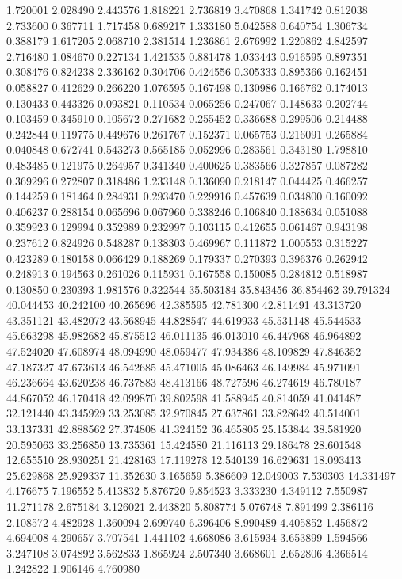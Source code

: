 1.720001
2.028490
2.443576
1.818221
2.736819
3.470868
1.341742
0.812038
2.733600
0.367711
1.717458
0.689217
1.333180
5.042588
0.640754
1.306734
0.388179
1.617205
2.068710
2.381514
1.236861
2.676992
1.220862
4.842597
2.716480
1.084670
0.227134
1.421535
0.881478
1.033443
0.916595
0.897351
0.308476
0.824238
2.336162
0.304706
0.424556
0.305333
0.895366
0.162451
0.058827
0.412629
0.266220
1.076595
0.167498
0.130986
0.166762
0.174013
0.130433
0.443326
0.093821
0.110534
0.065256
0.247067
0.148633
0.202744
0.103459
0.345910
0.105672
0.271682
0.255452
0.336688
0.299506
0.214488
0.242844
0.119775
0.449676
0.261767
0.152371
0.065753
0.216091
0.265884
0.040848
0.672741
0.543273
0.565185
0.052996
0.283561
0.343180
1.798810
0.483485
0.121975
0.264957
0.341340
0.400625
0.383566
0.327857
0.087282
0.369296
0.272807
0.318486
1.233148
0.136090
0.218147
0.044425
0.466257
0.144259
0.181464
0.284931
0.293470
0.229916
0.457639
0.034800
0.160092
0.406237
0.288154
0.065696
0.067960
0.338246
0.106840
0.188634
0.051088
0.359923
0.129994
0.352989
0.232997
0.103115
0.412655
0.061467
0.943198
0.237612
0.824926
0.548287
0.138303
0.469967
0.111872
1.000553
0.315227
0.423289
0.180158
0.066429
0.188269
0.179337
0.270393
0.396376
0.262942
0.248913
0.194563
0.261026
0.115931
0.167558
0.150085
0.284812
0.518987
0.130850
0.230393
1.981576
0.322544
35.503184
35.843456
36.854462
39.791324
40.044453
40.242100
40.265696
42.385595
42.781300
42.811491
43.313720
43.351121
43.482072
43.568945
44.828547
44.619933
45.531148
45.544533
45.663298
45.982682
45.875512
46.011135
46.013010
46.447968
46.964892
47.524020
47.608974
48.094990
48.059477
47.934386
48.109829
47.846352
47.187327
47.673613
46.542685
45.471005
45.086463
46.149984
45.971091
46.236664
43.620238
46.737883
48.413166
48.727596
46.274619
46.780187
44.867052
46.170418
42.099870
39.802598
41.588945
40.814059
41.041487
32.121440
43.345929
33.253085
32.970845
27.637861
33.828642
40.514001
33.137331
42.888562
27.374808
41.324152
36.465805
25.153844
38.581920
20.595063
33.256850
13.735361
15.424580
21.116113
29.186478
28.601548
12.655510
28.930251
21.428163
17.119278
12.540139
16.629631
18.093413
25.629868
25.929337
11.352630
3.165659
5.386609
12.049003
7.530303
14.331497
4.176675
7.196552
5.413832
5.876720
9.854523
3.333230
4.349112
7.550987
11.271178
2.675184
3.126021
2.443820
5.808774
5.076748
7.891499
2.386116
2.108572
4.482928
1.360094
2.699740
6.396406
8.990489
4.405852
1.456872
4.694008
4.290657
3.707541
1.441102
4.668086
3.615934
3.653899
1.594566
3.247108
3.074892
3.562833
1.865924
2.507340
3.668601
2.652806
4.366514
1.242822
1.906146
4.760980
